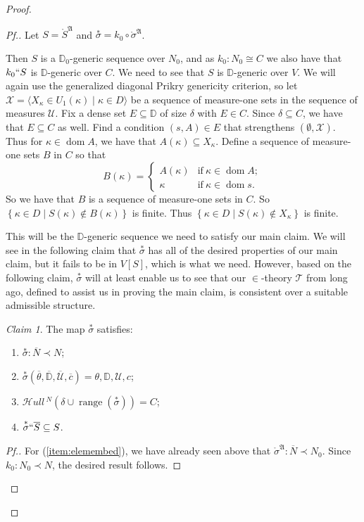 \documentclass{amsart}
\theoremstyle{definition}
\theoremstyle{remark}
\newtheorem{claimno}{Claim}
\newcommand{\D}{\mathbb{D}}
\newcommand{\N}{{\overline{N}}}
\renewcommand{\S}{{\overline{S}}}
\newcommand{\U}{\mathcal{U}}
\DeclareMathOperator{\ran}{range}
\DeclareMathOperator{\dom}{dom}
\newcommand{\st}{\; | \;}
\newcommand{\set}[2]{\left\{#1\st #2 \right\}}
\newcommand{\seq}[2]{\langle #1 \st #2 \rangle}
\newcommand{\SH}{\mathcal{H}\textit{ull} \,}
\newcommand{\sk}[3]{\SH^{#1}( {#2} \cup {\ran(#3)} ) }
\begin{document}
\begin{proof}
\begin{proof}[Pf.]
Let $S = \mathring{S}^{\mathfrak A}$ and $\overset{*} {\sigma}=k_0 \circ \mathring{\sigma}^{\mathfrak A}$. 

Then $S$ is a $\D_0$-generic sequence over $N_0$, and as $k_0:N_0 \cong C$ we also have that $k_0``S$ is $\D$-generic over $C$. 
We need to see that $S$ is $\D$-generic over $V$. 
We will again use the generalized diagonal Prikry genericity criterion, so let $\mathcal X = \seq{ X_\kappa \in U_1(\kappa) }{ \kappa \in D }$ be a sequence of measure-one sets in the sequence of measures $\U$. Fix a dense set $E \subseteq \D$ of size $\delta$ with $E \in C$. Since $\delta \subseteq C$, we have that $E \subseteq C$ as well. Find a condition $(s,A) \in E$ that strengthens $(\emptyset, \mathcal X)$. Thus for $\kappa \in \dom A$, we have that $A(\kappa) \subseteq X_\kappa$. Define a sequence of measure-one sets $B$ in $C$ so that 
$$B(\kappa) = \begin{cases} A(\kappa) &\text{if} \ \kappa \in \dom A; \\ \kappa &\text{if} \ \kappa \in \dom s. \end{cases}$$
So we have that $B$ is a sequence of measure-one sets in $C$. So $\set{ \kappa \in D }{S(\kappa) \notin B(\kappa) }$ is finite. Thus $\set{\kappa \in D}{ S(\kappa) \notin X_\kappa}$ is finite.


This will be the $\D$-generic sequence we need to satisfy our main claim. We will see in the following claim that $\overset{*} \sigma$ has all of the desired properties of our main claim, but it fails to be in $V[S]$, which is what we need. However, based on the following claim, $\overset{*}{\sigma}$ will at least enable us to see that our $\in$-theory $\mathcal T$ from long ago, defined to assist us in proving the main claim, is consistent over a suitable admissible structure.
\begin{claimno} The map $\overset{*}{\sigma}$ satisfies:
\begin{enumerate}
	\item \label{item:elemembed} $\overset{*} {\sigma}: \N \prec N$;
	\item \label{item:rangematches} $\overset{*} {\sigma}(\overline \theta, \overline{\D}, \overline{\U}, \overline c)=\theta, \D, \U, c$;
	\item \label{item:skolemC} $\sk{N}{\delta}{\overset{*}{\sigma}} = C$;	
	\item \label{item:lifts} $\overset{*} {\sigma} `` \S \subseteq S$.
\end{enumerate}
\end{claimno}
\begin{proof}[Pf.]
For (\ref{item:elemembed}), we have already seen above that $\mathring \sigma^{\mathfrak A}: \N \prec N_0$. Since $k_0:N_0 \prec N$, the desired result follows.


\end{proof}
\end{proof}
\end{proof}
\end{document}

